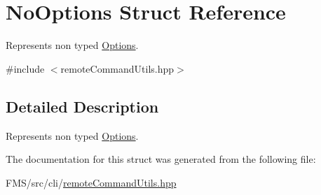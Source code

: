 \hypertarget{structNoOptions}{
\section{NoOptions Struct Reference}
\label{structNoOptions}
}


Represents non typed \hyperlink{classOptions}{Options}.  




{\ttfamily \#include $<$remoteCommandUtils.hpp$>$}



\subsection{Detailed Description}
Represents non typed \hyperlink{classOptions}{Options}. 

The documentation for this struct was generated from the following file:\begin{DoxyCompactItemize}
\item 
FMS/src/cli/\hyperlink{remoteCommandUtils_8hpp}{remoteCommandUtils.hpp}\end{DoxyCompactItemize}
